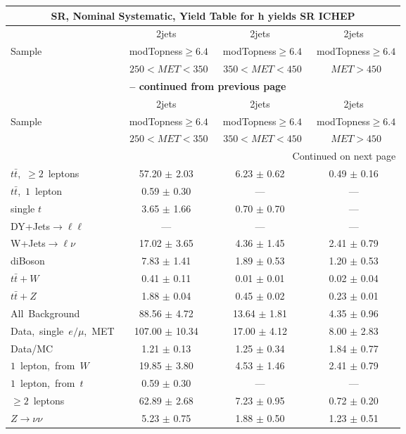 \documentclass{article}
\begin{document}
\tiny




\begin{longtable}{|l|c|c|c|} 
 
\multicolumn{4}{c}{ SR, Nominal Systematic, Yield Table for h yields SR ICHEP }\\* \hline 
  & 2jets  & 2jets  & 2jets \\* 
Sample  & ~modTopness$\ge6.4$  & ~modTopness$\ge6.4$  & ~modTopness$\ge6.4$ \\* 
  & ~$250<MET<350$  & ~$350<MET<450$  & ~$MET>450$ \\* 
\hline \hline 
\endfirsthead 
 
\multicolumn{4}{c}{{\bfseries \tablename\ \thetable{} -- continued from previous page}}\\* \hline 
  & 2jets  & 2jets  & 2jets \\* 
Sample  & ~modTopness$\ge6.4$  & ~modTopness$\ge6.4$  & ~modTopness$\ge6.4$ \\* 
  & ~$250<MET<350$  & ~$350<MET<450$  & ~$MET>450$ \\* 
\hline \hline 
\endhead 
 
\multicolumn{4}{|r|}{{Continued on next page}}\\* \hline 
\endfoot 
 
 
\endlastfoot 
 
$t\bar{t}$,~$\ge2$~leptons & 57.20 $\pm$ 2.03  & 6.23 $\pm$ 0.62  & 0.49 $\pm$ 0.16 \\* 
$t\bar{t}$,~$1$~lepton & 0.59 $\pm$ 0.30  & ---  & --- \\* 
single $t$  & 3.65 $\pm$ 1.66  & 0.70 $\pm$ 0.70  & --- \\* 
DY+Jets$\rightarrow\ell\ell$  & ---  & ---  & --- \\* 
W+Jets$\rightarrow\ell\nu$  & 17.02 $\pm$ 3.65  & 4.36 $\pm$ 1.45  & 2.41 $\pm$ 0.79 \\* 
diBoson  & 7.83 $\pm$ 1.41  & 1.89 $\pm$ 0.53  & 1.20 $\pm$ 0.53 \\* 
$t\bar{t}+W$  & 0.41 $\pm$ 0.11  & 0.01 $\pm$ 0.01  & 0.02 $\pm$ 0.04 \\* 
$t\bar{t}+Z$  & 1.88 $\pm$ 0.04  & 0.45 $\pm$ 0.02  & 0.23 $\pm$ 0.01 \\* 
\hline \hline 
All~Background  & 88.56 $\pm$ 4.72  & 13.64 $\pm$ 1.81  & 4.35 $\pm$ 0.96 \\* 
Data,~single~$e/\mu$,~MET  & 107.00 $\pm$ 10.34  & 17.00 $\pm$ 4.12  & 8.00 $\pm$ 2.83 \\* 
Data/MC  & 1.21 $\pm$ 0.13  & 1.25 $\pm$ 0.34  & 1.84 $\pm$ 0.77 \\* 
\hline \hline 
$1$~lepton,~from~$W$  & 19.85 $\pm$ 3.80  & 4.53 $\pm$ 1.46  & 2.41 $\pm$ 0.79 \\* 
$1$~lepton,~from~$t$  & 0.59 $\pm$ 0.30  & ---  & --- \\* 
$\ge2$~leptons  & 62.89 $\pm$ 2.68  & 7.23 $\pm$ 0.95  & 0.72 $\pm$ 0.20 \\* 
$Z\rightarrow\nu\nu$  & 5.23 $\pm$ 0.75  & 1.88 $\pm$ 0.50  & 1.23 $\pm$ 0.51 \\* 
\hline 
\end{longtable} 
\end{document}

